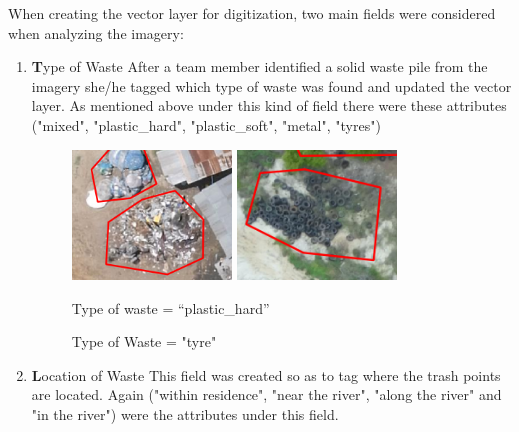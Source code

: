 \documentclass[a4paper,12pt,twoside]{article}
\begin{document}
    When creating the vector layer for digitization, two main fields were considered when analyzing the imagery:
    
         \begin{enumerate}
            \item \textbf Type of Waste
            After a team member identified a solid waste pile from the imagery she/he tagged which type of waste was found and updated the vector layer. As mentioned above under this kind of field there were these attributes ("mixed", "plastic_hard", "plastic_soft", "metal", "tyres")
            
                \begin{figure} %
                    \centering
                    \includegraphics[width=0.4\textwidth]{images/image19.png}
                    \includegraphics[width=0.4\textwidth]{images/image3.png}
                    \caption{Type of waste = “plastic_hard”}
                    \caption{Type of Waste = "tyre"}
                \end{figure}
                
            \item \textbf Location of Waste
            This field was created so as to tag where the trash points are located. Again ("within residence", "near the river", "along the river" and "in the river") were the attributes under this field.
                

\end{enumerate}
\end{document}

